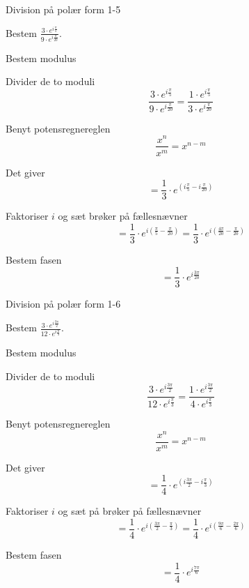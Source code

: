 \documentclass{article}
\begin{document}
\newpage

\begin{exercise}{Division på polær form 1-5}
	
	Bestem $ \frac{3 \cdot e^{i \frac{\pi}{5}}}{9 \cdot e^{i \frac{\pi}{20}}}$.
	
	
	
	\hint 
	
	Bestem modulus
	
	
	\hint
	
	Divider de to moduli
	\[
	\frac{3 \cdot e^{i \frac{\pi}{5}}}{9 \cdot e^{i \frac{\pi}{20}}} = \frac{1 \cdot e^{i \frac{\pi}{5}}}{3 \cdot e^{i \frac{\pi}{20}}} 
	\]
	
	\hint 
	
	Benyt potensregnereglen
	\[
	\frac{x^n}{x^m} = x^{n-m}
	\]
	
	\hint
	
	Det giver
	\[
	=\frac{1}{3} \cdot e^{ (i \frac{\pi}{5}-i \frac{\pi}{20}) }
	\]
	
	\hint
	
	Faktoriser $i$ og  sæt brøker på fællesnævner
	\[
	= \frac{1}{3} \cdot e^{ i( \frac{\pi}{5}-\frac{\pi}{20}) }  =	\frac{1}{3} \cdot e^{ i( \frac{4\pi}{20}-\frac{\pi}{20}) }
	\]
	
	\hint
	
	Bestem fasen
	\[
	= \frac{1}{3} \cdot e^{ i \frac{3\pi}{20} }
	\]
	
\end{exercise}

\newpage

\begin{exercise}{Division på polær form 1-6}
	
	Bestem $ \frac{3 \cdot e^{i \frac{3\pi}{2}}}{12 \cdot e^{i \frac{\pi}{3}}}$.
	
	
	
	\hint 
	
	Bestem modulus
	
	
	\hint
	
	Divider de to moduli
	\[
	\frac{3 \cdot e^{i \frac{3\pi}{2}}}{12 \cdot e^{i \frac{\pi}{3}}} = \frac{1 \cdot e^{i \frac{3\pi}{2}}}{4 \cdot e^{i \frac{\pi}{3}}}
	\]
	
	\hint 
	
	Benyt potensregnereglen
	\[
	\frac{x^n}{x^m} = x^{n-m}
	\]
	
	\hint
	
	Det giver
	\[
	= \frac{1}{4} \cdot e^{(i \frac{3 \pi}{2}-i \frac{\pi}{3})}
	\]
	
	\hint
	
	Faktoriser $i$ og sæt på brøker på fællesnævner
	\[
	= \frac{1}{4} \cdot e^{i( \frac{3 \pi}{2}- \frac{\pi}{3})} = \frac{1}{4} \cdot e^{i( \frac{9 \pi}{6}- \frac{2\pi}{6})} 
	\]
	
	\hint
	
	Bestem fasen
	\[
	= \frac{1}{4} \cdot e^{i \frac{7\pi}{6}}
	\]
	
	
\end{exercise}
\end{document}
